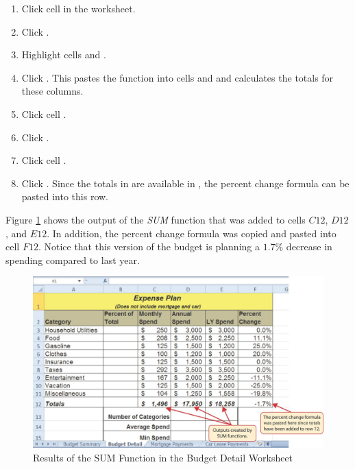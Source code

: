 \begin{enumerate}
	\item Click cell  in the  worksheet.
	\item Click .
	\item Highlight cells  and .
	\item Click . This pastes the  function into cells  and  and calculates the totals for these columns.
	\item Click cell .
	\item Click .
	\item Click cell .
	\item Click . Since the totals in are available in , the percent change formula can be pasted into this row.
\end{enumerate}

Figure \ref{02:fig12} shows the output of the \textit{SUM} function that was added to cells $ C12 $, $ D12 $, and $ E12 $. In addition, the percent change formula was copied and pasted into cell $ F12 $. Notice that this version of the budget is planning a $ 1.7 $\% decrease in spending compared to last year.

\begin{figure}[H]
	\centering
	\includegraphics[width=\maxwidth{.95\linewidth}]{gfx/ch02_fig12}
	\caption{Results of the SUM Function in the Budget Detail Worksheet}
	\label{02:fig12}
\end{figure}

